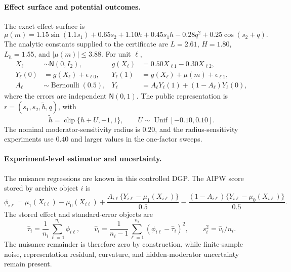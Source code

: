 \documentclass[11pt]{article}
\numberwithin{equation}{section}
\newcommand{\1}{\mathbf 1}
\begin{document}
\paragraph{Effect surface and potential outcomes.}
The exact effect surface is
\begin{equation}
\label{eq:v1-app-effect-surface}
\mu(m)=1.15\sin(1.1s_1)+0.65s_2+1.10h+0.45s_1h-0.28q^2+0.25\cos(s_2+q).
\end{equation}
The analytic constants supplied to the certificate are $L=2.61$, $H=1.80$, $L_h=1.55$, and $|\mu(m)|\le 3.88$.  For unit $\ell$,
\begin{align}
X_\ell&\sim\mathsf N(0,I_2),
&g(X_\ell)&=0.50X_{\ell1}-0.30X_{\ell2},\\
Y_\ell(0)&=g(X_\ell)+\epsilon_{\ell0},
&Y_\ell(1)&=g(X_\ell)+\mu(m)+\epsilon_{\ell1},\\
A_\ell&\sim\operatorname{Bernoulli}(0.5),
&Y_\ell&=A_\ell Y_\ell(1)+(1-A_\ell)Y_\ell(0),
\end{align}
where the errors are independent $\mathsf N(0,1)$.  The public representation is $r=(s_1,s_2,\widetilde h,q)$, with
\[
  \widetilde h=\operatorname{clip}\{h+U,-1,1\},
  \qquad U\sim\operatorname{Unif}[-0.10,0.10].
\]
The nominal moderator-sensitivity radius is $0.20$, and the radius-sensitivity experiments use $0.40$ and larger values in the one-factor sweeps.

\paragraph{Experiment-level estimator and uncertainty.}
The nuisance regressions are known in this controlled DGP.  The AIPW score stored by archive object $i$ is
\begin{equation}
\label{eq:v1-app-aipw}
\phi_{i\ell}=\mu_1(X_{i\ell})-\mu_0(X_{i\ell})
 +\frac{A_{i\ell}\{Y_{i\ell}-\mu_1(X_{i\ell})\}}{0.5}
 -\frac{(1-A_{i\ell})\{Y_{i\ell}-\mu_0(X_{i\ell})\}}{0.5}.
\end{equation}
The stored effect and standard-error objects are
\begin{equation}
\label{eq:v1-app-variance}
\widehat\tau_i=\frac{1}{n_i}\sum_{\ell=1}^{n_i}\phi_{i\ell},
\qquad
\widehat v_i=\frac{1}{n_i-1}\sum_{\ell=1}^{n_i}(\phi_{i\ell}-\widehat\tau_i)^2,
\qquad
s_i^2=\widehat v_i/n_i.
\end{equation}
The nuisance remainder is therefore zero by construction, while finite-sample noise, representation residual, curvature, and hidden-moderator uncertainty remain present.
\end{document}
